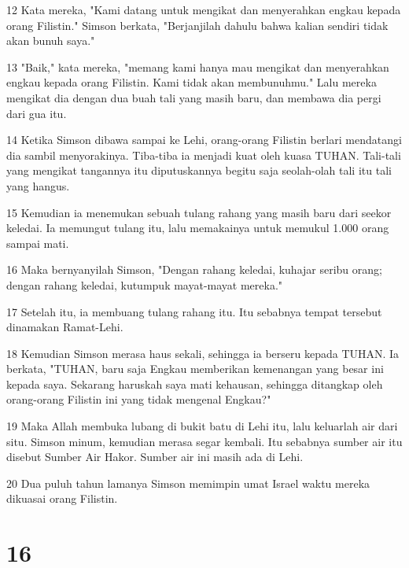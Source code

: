 \par 12 Kata mereka, "Kami datang untuk mengikat dan menyerahkan engkau kepada orang Filistin." Simson berkata, "Berjanjilah dahulu bahwa kalian sendiri tidak akan bunuh saya."
\par 13 "Baik," kata mereka, "memang kami hanya mau mengikat dan menyerahkan engkau kepada orang Filistin. Kami tidak akan membunuhmu." Lalu mereka mengikat dia dengan dua buah tali yang masih baru, dan membawa dia pergi dari gua itu.
\par 14 Ketika Simson dibawa sampai ke Lehi, orang-orang Filistin berlari mendatangi dia sambil menyorakinya. Tiba-tiba ia menjadi kuat oleh kuasa TUHAN. Tali-tali yang mengikat tangannya itu diputuskannya begitu saja seolah-olah tali itu tali yang hangus.
\par 15 Kemudian ia menemukan sebuah tulang rahang yang masih baru dari seekor keledai. Ia memungut tulang itu, lalu memakainya untuk memukul 1.000 orang sampai mati.
\par 16 Maka bernyanyilah Simson, "Dengan rahang keledai, kuhajar seribu orang; dengan rahang keledai, kutumpuk mayat-mayat mereka."
\par 17 Setelah itu, ia membuang tulang rahang itu. Itu sebabnya tempat tersebut dinamakan Ramat-Lehi.
\par 18 Kemudian Simson merasa haus sekali, sehingga ia berseru kepada TUHAN. Ia berkata, "TUHAN, baru saja Engkau memberikan kemenangan yang besar ini kepada saya. Sekarang haruskah saya mati kehausan, sehingga ditangkap oleh orang-orang Filistin ini yang tidak mengenal Engkau?"
\par 19 Maka Allah membuka lubang di bukit batu di Lehi itu, lalu keluarlah air dari situ. Simson minum, kemudian merasa segar kembali. Itu sebabnya sumber air itu disebut Sumber Air Hakor. Sumber air ini masih ada di Lehi.
\par 20 Dua puluh tahun lamanya Simson memimpin umat Israel waktu mereka dikuasai orang Filistin.

\chapter{16}

